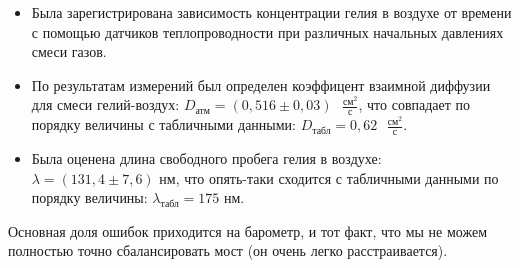 \documentclass[a4paper,12pt]{article}
\theoremstyle{definition}
\begin{document}
		\begin{itemize}
			\item Была зарегистрирована зависимость концентрации гелия в воздухе от времени с помощью датчиков теплопроводности при различных начальных давлениях смеси газов.
			\item По результатам измерений был определен коэффицент взаимной диффузии для смеси гелий-воздух: $D_\text{атм} = (0,516\pm0,03)\text{ } \frac{\text{см}^2}{\text{с}}$, что совпадает по порядку величины с табличными данными: $D_\text{табл} = 0,62\text{ } \frac{\text{см}^2}{\text{с}}$.
			\item Была оценена длина свободного пробега гелия в воздухе: $\lambda = (131,4\pm7,6)\text{ нм}$, что опять-таки сходится с табличными данными по  порядку величины: $\lambda_\text{табл} = 175\text{ нм}$. 
		\end{itemize}
		Основная доля ошибок приходится на барометр, и тот факт, что мы не можем полностью точно сбалансировать мост (он очень легко расстраивается).
		
		
	
	
\end{document}
